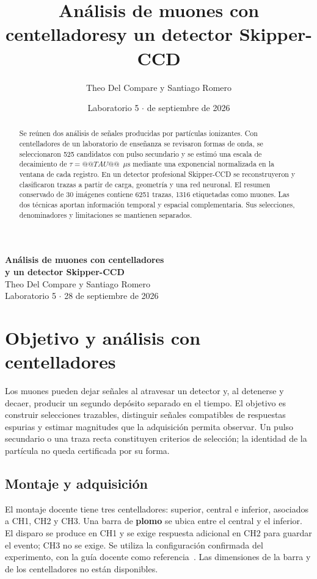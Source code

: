 \documentclass[10pt,a4paper]{article}
\title{\vspace{-1.2cm}\textbf{Análisis de muones con centelladores\newline y un detector Skipper-CCD}}
\author{Theo Del Compare \quad y \quad Santiago Romero}
\date{Laboratorio 5 \quad $\cdot$ \quad 28 de septiembre de 2026}
\newcommand{\us}{\ensuremath{\mu\mathrm{s}}}
\begin{document}
\begin{center}
{\Large\bfseries Análisis de muones con centelladores\\[2pt] y un detector Skipper-CCD}\\[5pt]
Theo Del Compare \quad y \quad Santiago Romero\\[2pt]
{\small Laboratorio 5 $\cdot$ 28 de septiembre de 2026}
\end{center}
\vspace{-2mm}
\begin{abstract}
Se reúnen dos análisis de señales producidas por partículas ionizantes. Con centelladores de un laboratorio de enseñanza se revisaron formas de onda, se seleccionaron 525 candidatos con pulso secundario y se estimó una escala de decaimiento de $\tau=@@TAU@@$~\us{} mediante una exponencial normalizada en la ventana de cada registro. En un detector profesional Skipper-CCD se reconstruyeron y clasificaron trazas a partir de carga, geometría y una red neuronal. El resumen conservado de 30 imágenes contiene 6251 trazas, 1316 etiquetadas como muones. Las dos técnicas aportan información temporal y espacial complementaria. Sus selecciones, denominadores y limitaciones se mantienen separados.
\end{abstract}

\section{Objetivo y análisis con centelladores}
Los muones pueden dejar señales al atravesar un detector y, al detenerse y decaer, producir un segundo depósito separado en el tiempo. El objetivo es construir selecciones trazables, distinguir señales compatibles de respuestas espurias y estimar magnitudes que la adquisición permita observar. Un pulso secundario o una traza recta constituyen criterios de selección; la identidad de la partícula no queda certificada por su forma.

\subsection*{Montaje y adquisición}
El montaje docente tiene tres centelladores: superior, central e inferior, asociados a CH1, CH2 y CH3. Una barra de \textbf{plomo} se ubica entre el central y el inferior. El disparo se produce en CH1 y se exige respuesta adicional en CH2 para guardar el evento; CH3 no se exige. Se utiliza la configuración confirmada del experimento, con la guía docente como referencia~\cite{guia}. Las dimensiones de la barra y de los centelladores no están disponibles.
\end{document}

